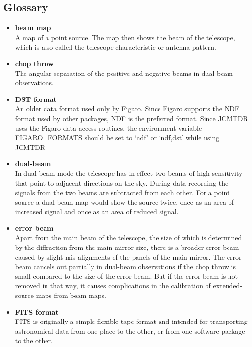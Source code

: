 \subsection{\label{gloss}Glossary}

\begin{itemize}

\item{\bf \label{glossbeammap}beam map}\\
   A map of a point source. The map
   then shows the beam of the telescope, which is also called the
   telescope characteristic or antenna pattern.

\item{\bf \label{glosschopthrow}chop throw}\\
   The angular separation of the
   positive and negative beams in dual-beam observations.

\item{\bf \label{glossdst}DST format}\\
   An older data format used only by
   Figaro. Since Figaro supports the NDF format used by other packages,
   NDF is the preferred format. Since JCMTDR uses the Figaro data access
   routines, the environment variable FIGARO\_FORMATS should be set to
   `ndf' or `ndf,dst' while using JCMTDR.

\item{\bf \label{glossdualbeam}dual-beam}\\
   In dual-beam mode the telescope
   has in effect two beams of high
   sensitivity that point to adjacent directions on the sky. During data
   recording the signals from the two beams are subtracted from each
   other. For a point source a dual-beam map would show the source
   twice, once as an area of increased signal and once as an area of
   reduced signal.

\item{\bf \label{glosserrorbeam}error beam}\\
   Apart from the main beam of the
   telescope, the size of which is determined by the diffraction from
   the main mirror size, there is a broader error beam caused by slight
   mis-alignments of the panels of the main mirror. The error beam
   cancels out partially in dual-beam observations if the chop throw is
   small compared to the size of the error beam. But if the error beam
   is not removed in that way, it causes complications in the
   calibration of extended-source maps from beam maps.

\item{\bf \label{glossfits}FITS format}\\
   FITS is originally a simple flexible
   tape format and intended for transporting astronomical data from one
   place to the other, or from one software package to the other.


\end{itemize}
